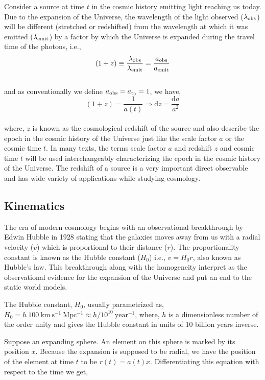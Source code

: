 Consider a source at time $t$ in the cosmic history emitting light reaching us today. 
Due to the expansion of the Universe, the wavelength of the light observed 
($\lambda_{\rm obs}$) will be different (stretched or redshifted) from the 
wavelength at which it was emitted ($\lambda_{\rm emit}$) by a factor by which
the Universe is expanded during the travel time of the photons, i.e.,
\begin{equation}
	(1+z) \equiv \dfrac{\lambda_{\rm obs}}{\lambda_{\rm emit}} = \dfrac{a_{\rm obs}}{a_{\rm emit}}
\end{equation}
\\
and as conventionally we define $a_{\rm obs} = a_{\rm t_0} = 1$, we have,
\begin{equation}
	(1+z) = \dfrac{1}{a(t)} \Rightarrow \mathrm{d}z = \dfrac{\mathrm{d}a}{a^2}
\end{equation}
\\
where, $z$ is known as the cosmological redshift of the source and also describe
the epoch in the cosmic history of the Universe just like the scale factor $a$ or 
the cosmic time $t$. In many texts, the terms scale factor 
$a$ and redshift $z$ and cosmic time $t$ will be used interchangeably 
characterizing the epoch in the cosmic history of the Universe. The redshift
of a source is a very important direct observable and has wide variety of 
applications while studying cosmology.



\subsection{Kinematics}

The era of modern cosmology begins with an observational breakthrough by Edwin Hubble 
in 1928 stating that the galaxies moves away from us with a radial velocity ($v$) which
is proportional to their distance ($r$). The proportionality constant is known
as the Hubble constant ($H_0$) i.e., $v=H_0 r$, also known as Hubble's law. 
This breakthrough along with the
homogeneity interpret as the observational evidence for the expansion of the Universe and
put an end to the static world models.

The Hubble constant, $H_0$, usually parametrized as, 
$H_0 = h\ 100\ \mathrm{km\ s^{-1}\ Mpc^{-1}} \approx h/10^{10}\ \mathrm{year^{-1}}$,
where, $h$ is a dimensionless number of the order unity and gives the 
Hubble constant in units of 10 billion years inverse. 

Suppose an expanding sphere. An element on this sphere is marked by
its position $x$. Because the expansion is supposed to be radial, we have the
position of the element at time $t$ to be $r(t) = a(t) x$. Differentiating 
this equation with respect to the time we get,

